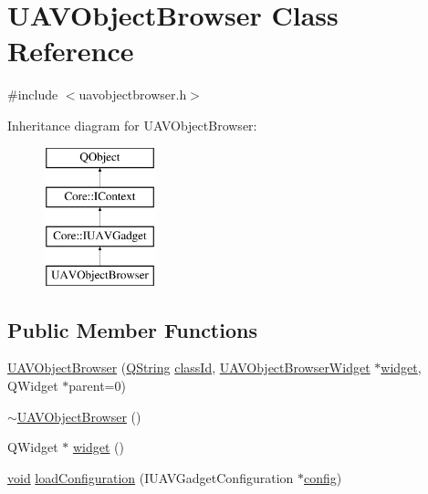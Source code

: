 \hypertarget{class_u_a_v_object_browser}{\section{U\-A\-V\-Object\-Browser Class Reference}
\label{class_u_a_v_object_browser}
}


{\ttfamily \#include $<$uavobjectbrowser.\-h$>$}

Inheritance diagram for U\-A\-V\-Object\-Browser\-:\begin{figure}[H]
\begin{center}
\leavevmode
\includegraphics[height=4.000000cm]{class_u_a_v_object_browser}
\end{center}
\end{figure}
\subsection*{Public Member Functions}
\begin{DoxyCompactItemize}
\item 
\hyperlink{group___u_a_v_object_browser_plugin_ga9723050126ebdcc8952f6190cf8f7dbf}{U\-A\-V\-Object\-Browser} (\hyperlink{group___u_a_v_objects_plugin_gab9d252f49c333c94a72f97ce3105a32d}{Q\-String} \hyperlink{group___core_plugin_ga3878fde66a57220608960bcc3fbeef2c}{class\-Id}, \hyperlink{class_u_a_v_object_browser_widget}{U\-A\-V\-Object\-Browser\-Widget} $\ast$\hyperlink{group___u_a_v_object_browser_plugin_ga8ed7f7a3fa9ad46c595ee27903636dfe}{widget}, Q\-Widget $\ast$parent=0)
\item 
\hyperlink{group___u_a_v_object_browser_plugin_gacacc07d4e73a9da5c6faee7763dde1b4}{$\sim$\-U\-A\-V\-Object\-Browser} ()
\item 
Q\-Widget $\ast$ \hyperlink{group___u_a_v_object_browser_plugin_ga8ed7f7a3fa9ad46c595ee27903636dfe}{widget} ()
\item 
\hyperlink{group___u_a_v_objects_plugin_ga444cf2ff3f0ecbe028adce838d373f5c}{void} \hyperlink{group___u_a_v_object_browser_plugin_gaf13947eb936ed7bb3d885d099fcc5ca2}{load\-Configuration} (I\-U\-A\-V\-Gadget\-Configuration $\ast$\hyperlink{deflate_8c_a4473b5227787415097004fd39f55185e}{config})
\end{DoxyCompactItemize}
